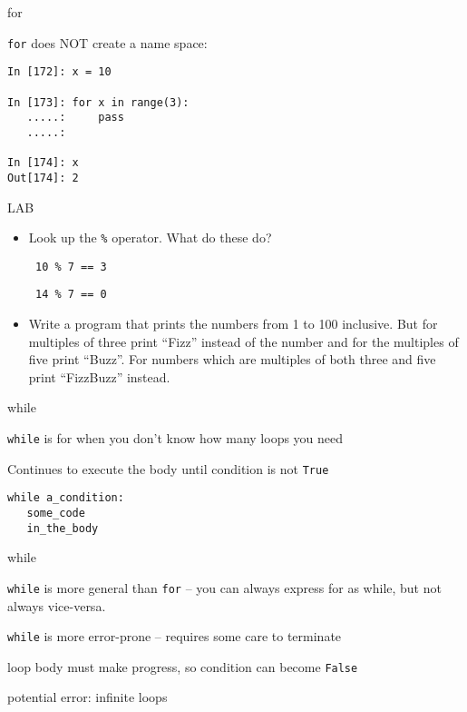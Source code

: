 \documentclass{beamer}
\begin{document}
\begin{frame}[fragile]{for}

{\Large \verb|for| does NOT create a name space:}

\begin{verbatim}
In [172]: x = 10

In [173]: for x in range(3):
   .....:     pass
   .....: 

In [174]: x
Out[174]: 2
\end{verbatim}
\end{frame}

\begin{frame}[fragile]{LAB}

\begin{itemize}

  \item Look up the \verb+%+ operator. What do these do?

    \verb| 10 % 7 == 3 |

    \verb| 14 % 7 == 0 |

  \item  Write a program that prints the numbers from 1 to 100 inclusive.
But for multiples of three print ``Fizz'' instead of the number and for the
multiples of five print ``Buzz''. For numbers which are multiples of both three
and five print ``FizzBuzz'' instead.

\end{itemize}

\end{frame}


\begin{frame}[fragile]{while}

{\Large \verb|while| is for when you don't know how many loops you need}

\vfill
{\Large Continues to execute the body until condition is not \verb|True|}

\begin{verbatim}
while a_condition:
   some_code
   in_the_body
\end{verbatim}
\end{frame}



\begin{frame}[fragile]{while}

{\Large \verb|while| is more general than \verb|for| -- 
you can always express for as while,
but not always vice-versa.}

\vfill

{\Large \verb|while| is more error-prone -- requires some care to terminate}

\vfill
{\Large  loop body must make progress, so condition can become \verb|False| }

\vfill
{\Large  potential error: infinite loops }
\end{frame}
\end{document}
